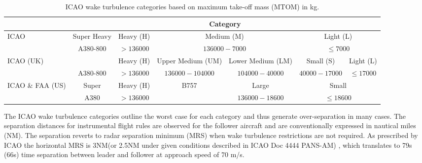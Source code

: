 \begin{table}
    \centering
    \resizebox{1\textwidth}{!} {
    \begin{tabular}{l|c|c|c|c|c|c}
    ~    & \multicolumn{6}{c}{Category} \\ \hline
    ICAO & Super Heavy & Heavy (H) & \multicolumn{2}{c|}{Medium (M)} & \multicolumn{2}{c}{Light (L)} \\
    
    ~    & A380-800    & $ > 136000 $  & \multicolumn{2}{c|}{$ 136000-7000 $ } & \multicolumn{2}{c}{$ \leq 7000 $} \\ \hline
    
    ICAO (UK)   & ~  & Heavy (H) & Upper Medium (UM) & Lower Medium (LM) & Small (S)  & Light (L) \\
    
    ~    & A380-800    & $ > 136000 $  & $ 136000-104000 $     & $ 104000-40000 $      & $ 40000-17000 $ & $ \leq 17000 $   \\ \hline
    
    ICAO \& FAA (US)   & Super      & Heavy (H) & B757   & Large   & \multicolumn{2}{c}{Small} \\
    
    ~    & A380        & $ > 136000 $  & ~                 & $ 136000-18600 $      & \multicolumn{2}{c}{$ \leq 18600 $} \\ 
    \end{tabular}}
    \caption[ICAO wake turbulence categories based on maximum take-off mass]{ICAO wake turbulence categories based on maximum take-off mass (MTOM) in kg. \cite{icao_wtc, uk_aeronautical_information_services_wake_2017, kolos2013influence}} \label{tab:WTC}
\end{table}

The ICAO wake turbulence categories outline the worst case for each category and thus generate over-separation in many cases\cite{noauthor_recat_2018}. The separation distances for instrumental flight rules are observed for the follower aircraft and are conventionally expressed in nautical miles (NM). The separation reverts to radar separation minimum (MRS) when wake turbulence restrictions are not required. As  prescribed  by  ICAO  the  horizontal MRS is 3NM(or 2.5NM under given conditions described in ICAO Doc 4444 PANS-AM) \cite{noauthor_icao_2018}, which translates to 79s (66s) time separation between leader and follower at approach speed of 70 m/s.


